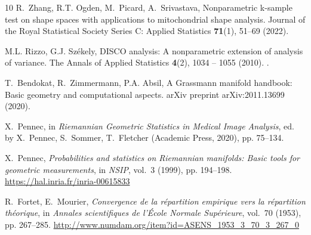 \documentclass[pdflatex,iicol]{sn-jnl}%
\theoremstyle{thmstyleone}%
\theoremstyle{thmstyletwo}%
\theoremstyle{thmstylethree}%
\begin{document}
\begin{thebibliography}{10}
R.~Zhang, R.T. Ogden, M.~Picard, A.~Srivastava, Nonparametric k-sample test on shape spaces with applications to mitochondrial shape analysis.
\newblock Journal of the Royal Statistical Society Series C: Applied Statistics \textbf{71}(1), 51--69 (2022).
\newblock {}

M.L. Rizzo, G.J. Sz{\'e}kely, {DISCO analysis: A nonparametric extension of analysis of variance}.
\newblock The Annals of Applied Statistics \textbf{4}(2), 1034 -- 1055 (2010).
\newblock {}.

T.~Bendokat, R.~Zimmermann, P.A. Absil, A {G}rassmann manifold handbook: Basic geometry and computational aspects.
\newblock arXiv preprint arXiv:2011.13699  (2020).
\newblock {}

X.~Pennec, in \emph{Riemannian Geometric Statistics in Medical Image Analysis}, ed. by X.~Pennec, S.~Sommer, T.~Fletcher (Academic Press, 2020), pp. 75--134.
\newblock {}

X.~Pennec, \emph{Probabilities and statistics on {R}iemannian manifolds: Basic tools for geometric measurements}, in \emph{NSIP}, vol.~3 (1999), pp. 194--198.
\newblock \urlprefix\url{https://hal.inria.fr/inria-00615833}

R.~Fortet, E.~Mourier, \emph{Convergence de la r{\'e}partition empirique vers la r{\'e}partition th{\'e}orique}, in \emph{Annales scientifiques de l'{\'E}cole Normale Sup{\'e}rieure}, vol.~70 (1953), pp. 267--285.
\newblock \urlprefix\url{http://www.numdam.org/item?id=ASENS_1953_3_70_3_267_0}

\end{thebibliography}
\end{document}

